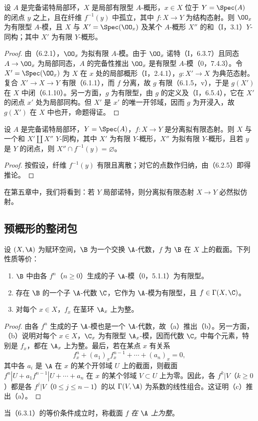 设 $A$ 是完备诺特局部环，$X$ 是局部有限型 $A$-概形，$x\in X$ 位于 $Y=\Spec(A)$ 的闭点 $y$ 之上，且在纤维 $f^{-1}(y)$ 中孤立，其中 $f:X\to Y$ 为结构态射。则 $\OO_x$ 为有限型 $A$-模，且 $X$ 与
$X'=\Spec(\OO_x)$ 及某个 $A$-概形 $X''$ 的和（I，3.1）$Y$-同构；其中 $X'$ 为有限 $Y$-概形。
\begin{proof}
由（6.2.1），$\OO_x$ 为拟有限 $A$-模。由于 $\OO_x$ 诺特（I，6.3.7）且同态 $A\to\OO_x$ 为局部同态，$A$ 的完备性推出 $\OO_x$ 是有限型 $A$-模（0，7.4.3）。令 $X'=\Spec(\OO_x)$ 为 $X$ 在 $x$ 处的局部概形（I，2.4.1），$g:X'\to X$ 为典范态射。复合 $X'\to X\to Y$ 有限（6.1.1），而 $f$ 分离，故 $g$ 有限（6.1.5，v），于是 $g(X')$ 在 $X$ 中闭（6.1.10）。另一方面，$g$ 为有限型，由 $g$ 的定义及（I，6.5.4），它在 $X'$ 的闭点 $x'$ 处为局部同构。但 $X'$ 是 $x'$ 的唯一开邻域，因而 $g$ 为开浸入，故 $g(X')$ 在 $X$ 中也开，命题得证。
\end{proof}

设 $A$ 是完备诺特局部环，$Y=\Spec(A)$，$f:X\to Y$ 是分离拟有限态射。则 $X$ 与一个和 $X'\amalg X''$ $Y$-同构，其中 $X'$ 为有限 $Y$-概形，$X''$ 为拟有限 $Y$-概形，且若 $y$ 是 $Y$ 的闭点，则 $X''\cap f^{-1}(y)=\varnothing$。
\begin{proof}
按假设，纤维 $f^{-1}(y)$ 有限且离散；对它的点数作归纳，由（6.2.5）即得推论。
\end{proof}

在第五章中，我们将看到：若 $Y$ 局部诺特，则分离拟有限态射 $X\to Y$ 必然拟仿射。

\subsection{预概形的整闭包}

设 $(X,\A)$ 为赋环空间，$\B$ 为一个交换 $\A$-代数，$f$ 为 $\B$ 在 $X$ 上的截面。下列性质等价：
\begin{enumerate}[label=\alph*)]
\item $\B$ 中由各 $f^n$（$n\geq0$）生成的子 $\A$-模（0，5.1.1）为有限型。
\item 存在 $\B$ 的一个子 $\A$-代数 $\C$，它作为 $\A$-模为有限型，且 $f\in\Gamma(X,\C)$。
\item 对每个 $x\in X$，$f_x$ 在茎环 $\A_x$ 上为整。
\end{enumerate}
\begin{proof}
由各 $f^n$ 生成的子 $\A$-模也是一个 $\A$-代数，故（a）推出（b）。另一方面，（b）说明对每个 $x\in X$，$\C_x$ 为有限型 $\A_x$-模，因而代数 $\C_x$ 中每个元素，特别是 $f_x$，都在 $\A_x$ 上为整。最后，若在某点 $x$ 有关系
\[
f_x^n+(a_1)_x f_x^{n-1}+\cdots+(a_n)_x=0,
\]
其中各 $a_i$ 是 $\A$ 在 $x$ 的某个开邻域 $U$ 上的截面，则截面
$f^n|U+a_1 f^{n-1}|U+\cdots+a_n$ 在 $x$ 的某个邻域 $V\subset U$ 上为零。因此，各 $f^k|V$（$k\geq0$）都是各 $f^j|V$（$0\leq j\leq n-1$）的以 $\Gamma(V,\A)$ 为系数的线性组合。这证明（c）推出（a）。
\end{proof}
当（6.3.1）的等价条件成立时，称截面 $f$ \emph{在 $\A$ 上为整}。


